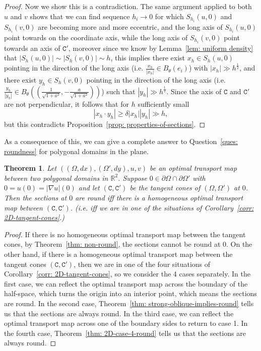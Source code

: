 \documentclass[12pt,reqno]{amsart}
\newtheorem{theorem}{Theorem}[section]
\numberwithin{equation}{section}
\begin{document}
\begin{proof}
            Now we show this is a contradiction. The same argument applied to both $u$ and $v$ shows that we can find sequence $h_i\to 0$ for which $S_{h_i}(u, 0)$ and $S_{h_i}(v, 0)$ are becoming more and more eccentric, and the long axis of $S_{h_i}(u, 0)$ point towards on the coordinate axis, while the long axis of $S_{h_i}(v, 0)$ point towards an axis of $\mathtt C'$, moreover since we know by Lemma~\ref{lem: uniform density} that $|S_h(u, 0)|\sim |S_h(v, 0)|\sim h$, this implies there exist $x_h\in S_h(u, 0)$ pointing in the direction of the long axis (i.e. $\frac{x_h}{|x_h|}\in B_{\theta}(e_i)$) with $|x
            _h|\gg h^{\frac 1 2}$, and there exist $y_h\in S_h(v, 0)$ pointing in the direction of the long axis (i.e. $\frac{y_h}{|y_h|}\in B_{\theta}((\frac{1}{\sqrt{1+a^2}}, -\frac{a}{\sqrt{1+a^2}}))$) such that $|y_h|\gg h^{\frac 1 2}$. Since the axis of $\mathtt C$ and $\mathtt C'$ are not perpendicular, it follows that for $h$ sufficiently small
            \[|x_h\cdot y_h| \geq \delta |x_h||y_h|\gg h,\]
            but this contradicts Proposition~\ref{prop: properties-of-sections}. 
        \end{proof}
        As a consequence of this, we can give a complete answer to Question~\ref{ques: roundness} for polygonal domains in the plane. 
        \begin{theorem}\label{thm: planar-C-1-1-reg-characterization}
            Let $((\Omega, dx), (\Omega', dy), u, v)$ be an optimal transport map between two polygonal domains in $\mathbb R^2$. Suppose $0\in\partial\Omega\cap\partial\Omega'$ with $0 = u(0)= |\nabla u|(0)$ and let $(\mathtt C, \mathtt C')$ be the tangent cones of $(\Omega, \Omega')$ at $0$. Then the sections at $0$ are round iff there is a homogeneous optimal transport map between $(\mathtt C, \mathtt C')$. (i.e. iff we are in one of the situations of Corollary~\ref{corr: 2D-tangent-cones}.)
        \end{theorem}
        \begin{proof}
            If there is no homogeneous optimal transport map between the tangent cones, by Theorem~\ref{thm: non-round}, the sections cannot be round at $0$. On the other hand, if there is a homogeneous optimal transport map between the tangent cones $(\mathtt C, \mathtt C')$, then we are in one of the four situations of Corollary~\ref{corr: 2D-tangent-cones}, so we consider the 4 cases separately. In the first case, we can reflect the optimal transport map across the boundary of the half-space, which turns the origin into an interior point, which means the sections are round. In the second case, Theorem~\ref{thm: strong-oblique-implies-round} tells us that the sections are always round. In the third case, we can reflect the optimal transport map across one of the boundary sides to return to case 1. In the fourth case, Theorem~\ref{thm: 2D-case-4-round} tells us that the sections are always round. 
        \end{proof}
\end{document}
